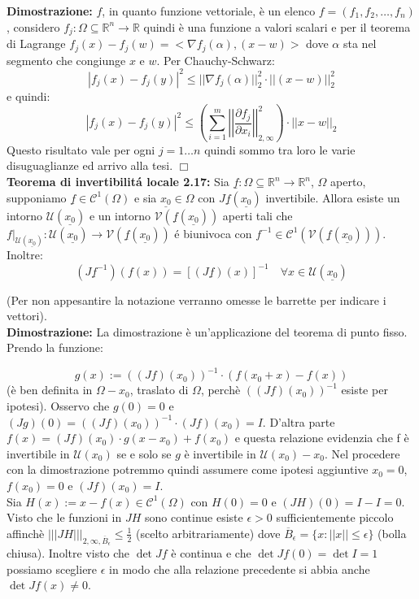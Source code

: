 \documentclass[a4paper,11pt,titlepage]{book}
\begin{document}
\textbf{Dimostrazione:}   $f$, in quanto funzione vettoriale, è un elenco $f=(f_1,f_2,\ldots,f_n)$, considero $f_j:\Omega\subseteq\mathbb{R}^n\to\mathbb{R}$ quindi è una funzione a valori scalari e per il teorema di Lagrange $f_j(x)-f_j(w)=<\nabla f_j(\alpha),(x-w)>$ dove $\alpha$ sta nel segmento che congiunge $x$ e $w$. Per Chauchy-Schwarz: $$|f_j(x)-f_j(y)|^2\leq||\nabla f_j(\alpha)||_2^2\cdot||(x-w)||_2^2$$ e quindi: $$|f_j(x)-f_j(y)|^2\leq\left(\sum_{i=1}^m \left|\left|\frac{\partial f_j}{\partial x_i}\right|\right|^2_{2,\infty}\right)\cdot ||x-w||_2$$ Questo risultato vale per ogni $j=1\ldots n$ quindi sommo tra loro le varie disuguaglianze ed arrivo alla tesi. $\Box$\\

\textbf{Teorema di invertibilitá locale 2.17:} Sia $\underline{f}:\Omega\subseteq\mathbb{R}^n\to\mathbb{R}^n$, $\Omega$ aperto, supponiamo $\underline{f}\in\mathcal{C}^1(\Omega)$ e sia $\underline{x_0}\in\Omega$ con $J\underline{f}(\underline{x_0})$ invertibile. Allora esiste un intorno $\mathcal{U}(\underline{x_0})$ e un intorno $\mathcal{V}(\underline{f}(\underline{x_0}))$ aperti tali che $f|_{\mathcal{U}(\underline{x_0})}:\mathcal{U}(\underline{x_0})\to\mathcal{V}(\underline{f}(\underline{x_0}))$ é biunivoca  con $f^{-1}\in\mathcal{C}^1(\mathcal{V}(\underline{f}(\underline{x_0})))$. Inoltre: $$ (J\underline{f}^{-1})(f(x))=[(J\underline{f})(x)]^{-1}\quad\forall x \in \mathcal{U}(\underline{x_0})$$

(Per non appesantire la notazione verranno omesse le barrette per indicare i vettori).\\

\textbf{Dimostrazione: }La dimostrazione è un'applicazione del teorema di punto fisso. Prendo la funzione:

$$g(x):=((Jf)(x_0))^{-1}\cdot(f(x_0+x)-f(x))$$
 (è ben definita in $\Omega-x_0$, traslato di $\Omega$, perchè $((Jf)(x_0))^{-1}$ esiste per ipotesi). Osservo che $g(0)=0$ e $(Jg)(0)=((Jf)(x_0))^{-1}\cdot(Jf)(x_0)=I$. D'altra parte $f(x)=(Jf)(x_0)\cdot g(x-x_0)+f(x_0)$ e questa relazione evidenzia che f è invertibile in $\mathcal{U}(x_0)$ se e solo se $g$ è invertibile in $\mathcal{U}(x_0)-x_0$. Nel procedere con la dimostrazione potremmo quindi assumere come ipotesi aggiuntive $x_0=0$, $f(x_0)=0$ e $(Jf)(x_0)=I$.\\

Sia $H(x):=x-f(x)\in\mathcal{C}^1(\Omega)$ con $H(0)=0$ e $(JH)(0)=I-I=0$. Visto che le funzioni in $JH$ sono continue esiste $\epsilon >0$ sufficientemente piccolo affinchè $|||JH|||_{2,\infty,\overline{B}_\epsilon}\leq\frac{1}{2}$ (scelto arbitrariamente) dove $\overline{B}_\epsilon=\{x:||x||\leq\epsilon\}$ (bolla chiusa). Inoltre visto che $\det Jf$ è continua e che $\det Jf(0)=\det I=1$ possiamo scegliere $\epsilon$ in modo che alla relazione precedente si abbia anche $\det Jf(x)\ne 0$. \\
\end{document}
